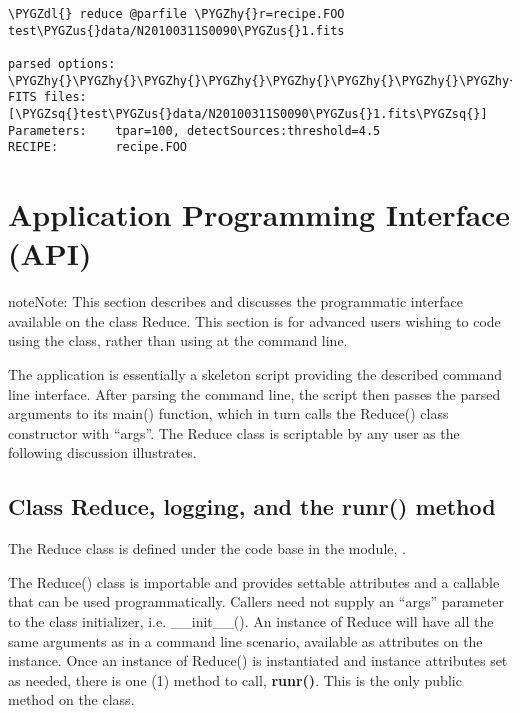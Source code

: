 \documentclass[letterpaper,10pt,english]{sphinxmanual}
\def\PYGZus{\char`\_}
\def\PYGZdl{\char`\$}
\def\PYGZhy{\char`\-}
\def\PYGZsq{\char`\'}
\begin{document}
\begin{Verbatim}[commandchars=\\\{\}]
\PYGZdl{} reduce @parfile \PYGZhy{}r=recipe.FOO test\PYGZus{}data/N20100311S0090\PYGZus{}1.fits

parsed options:
\PYGZhy{}\PYGZhy{}\PYGZhy{}\PYGZhy{}\PYGZhy{}\PYGZhy{}\PYGZhy{}\PYGZhy{}\PYGZhy{}\PYGZhy{}\PYGZhy{}\PYGZhy{}\PYGZhy{}\PYGZhy{}\PYGZhy{}
FITS files:    [\PYGZsq{}test\PYGZus{}data/N20100311S0090\PYGZus{}1.fits\PYGZsq{}]
Parameters:    tpar=100, detectSources:threshold=4.5
RECIPE:        recipe.FOO
\end{Verbatim}


\section{Application Programming Interface (API)}
\label{interfaces:application-programming-interface-api}
\begin{notice}{note}{Note:}
This section describes and discusses the programmatic interface
available on the class Reduce.  This section is for advanced
users wishing to code using the  class, rather than using
 at the command line.
\end{notice}

The  application is essentially a skeleton script providing the
described command line interface. After parsing the command line, the script
then passes the parsed arguments to its main() function, which in turn calls
the Reduce() class constructor with ``args''. The Reduce class is scriptable by
any user as the following discussion illustrates.


\subsection{Class Reduce, logging, and the runr() method}
\label{interfaces:class-reduce-logging-and-the-runr-method}
The Reduce class is defined under the  code base in the
 module, .

The Reduce() class is importable and provides settable attributes and a callable
that can be used programmatically. Callers need not supply an ``args'' parameter
to the class initializer, i.e. \_\_init\_\_(). An instance of Reduce will have all
the same arguments as in a command line scenario, available as attributes on the
instance. Once an instance of Reduce() is instantiated and instance attributes
set as needed, there is one (1) method to call, \textbf{runr()}. This is the only
public method on the class.
\end{document}
